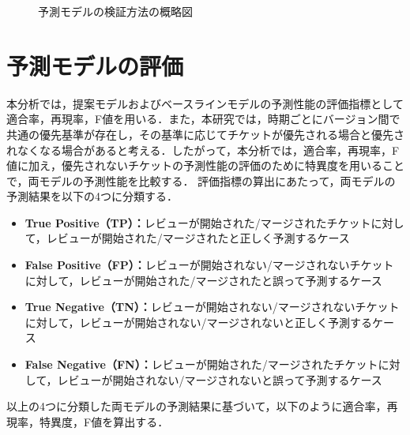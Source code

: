 \documentclass[11pt]{jreport}
\begin{document}
\begin{figure}[t]
\begin{center}
\caption{予測モデルの検証方法の概略図}
\label{fig:predict_schematic}
\end{center}
\end{figure}


\section{予測モデルの評価}\label{sec:hyoka}
本分析では，提案モデルおよびベースラインモデルの予測性能の評価指標として適合率，再現率，F値を用いる．また，本研究では，時期ごとにバージョン間で共通の優先基準が存在し，その基準に応じてチケットが優先される場合と優先されなくなる場合があると考える．したがって，本分析では，適合率，再現率，F値に加え，優先されないチケットの予測性能の評価のために特異度を用いることで，両モデルの予測性能を比較する．
評価指標の算出にあたって，両モデルの予測結果を以下の4つに分類する．

\begin{itemize}
  \item \textbf{True Positive（TP）：}レビューが開始された/マージされたチケットに対して，レビューが開始された/マージされたと正しく予測するケース
  \item \textbf{False Positive（FP）：}レビューが開始されない/マージされないチケットに対して，レビューが開始された/マージされたと誤って予測するケース
  \item \textbf{True Negative（TN）：}レビューが開始されない/マージされないチケットに対して，レビューが開始されない/マージされないと正しく予測するケース
  \item \textbf{False Negative（FN）：}レビューが開始された/マージされたチケットに対して，レビューが開始されない/マージされないと誤って予測するケース
\end{itemize}

以上の4つに分類した両モデルの予測結果に基づいて，以下のように適合率，再現率，特異度，F値を算出する．
\end{document}
